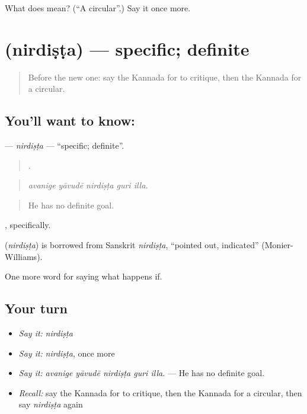 \begin{tcolorbox}[breakable,colback=teal!4,colframe=teal!35!black,title={Before you move on}]
What does  mean? (\textquotedblleft{}A circular\textquotedblright{}.) Say it once more.
\end{tcolorbox}
\section[\texorpdfstring{\kn{ನಿರ್ದಿಷ್ಟ} (nirdiṣṭa)}{ನಿರ್ದಿಷ್ಟ (nirdiṣṭa)}]{ (nirdiṣṭa) — specific; definite}

\label{lesson:KA-C424-nirdista}



\begin{quote}
Before the new one: say the Kannada for to critique, then the Kannada for a circular.
\end{quote}

\subsection*{You'll want to know: }
\textbf{} — \emph{nirdiṣṭa} — \textquotedblleft{}specific; definite\textquotedblright{}.

\begin{quote}
    .
\end{quote}

\begin{quote}
\emph{avanige yāvudē nirdiṣṭa guri illa.}
\end{quote}

\begin{quote}
He has no definite goal.
\end{quote}

, specifically.

\begin{cousinweb}
\textbf{} (\emph{nirdiṣṭa}) is borrowed from Sanskrit \emph{nirdiṣṭa}, \textquotedblleft{}pointed out, indicated\textquotedblright{} (Monier-Williams).
\end{cousinweb}

\begin{grammarlens}[title={What you've built}]
One more word for saying what happens if.
\end{grammarlens}

\subsection*{Your turn}
\begin{itemize}
\raggedright
  \item \emph{Say it:} \emph{nirdiṣṭa}
  \item \emph{Say it:} \emph{nirdiṣṭa}, once more
  \item \emph{Say it:} \emph{avanige yāvudē nirdiṣṭa guri illa.} — He has no definite goal.
  \item \emph{Recall:} say the Kannada for to critique, then the Kannada for a circular, then say \emph{nirdiṣṭa} again
\end{itemize}


